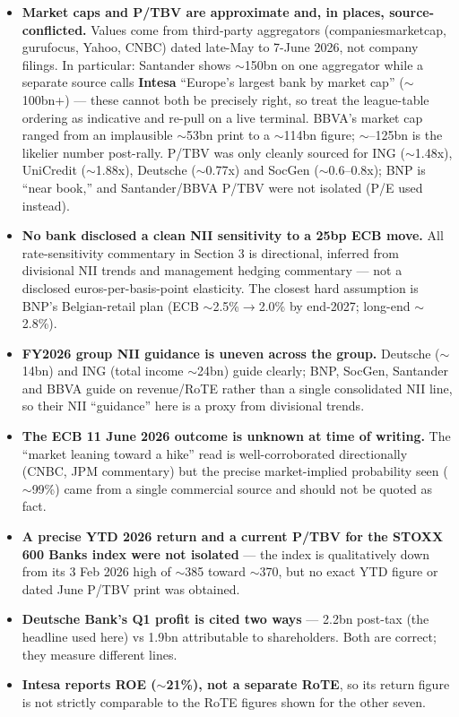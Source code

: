 \documentclass[10pt,a4paper]{article}
\begin{document}
\begin{itemize}
\item \textbf{Market caps and P/TBV are approximate and, in places, source-conflicted.} Values come from third-party aggregators (companiesmarketcap, gurufocus, Yahoo, CNBC) dated late-May to 7-June 2026, not company filings. In particular: Santander shows $\sim$\texteuro150bn on one aggregator while a separate source calls \textbf{Intesa} ``Europe's largest bank by market cap'' ($\sim$\texteuro100bn+) --- these cannot both be precisely right, so treat the league-table ordering as indicative and re-pull on a live terminal. BBVA's market cap ranged from an implausible $\sim$\texteuro53bn print to a $\sim$\texteuro114bn figure; $\sim$--125bn is the likelier number post-rally. P/TBV was only cleanly sourced for ING ($\sim$1.48x), UniCredit ($\sim$1.88x), Deutsche ($\sim$0.77x) and SocGen ($\sim$0.6--0.8x); BNP is ``near book,'' and Santander/BBVA P/TBV were not isolated (P/E used instead).

\item \textbf{No bank disclosed a clean NII sensitivity to a 25bp ECB move.} All rate-sensitivity commentary in Section 3 is directional, inferred from divisional NII trends and management hedging commentary --- not a disclosed euros-per-basis-point elasticity. The closest hard assumption is BNP's Belgian-retail plan (ECB $\sim$2.5\%$\rightarrow$2.0\% by end-2027; long-end $\sim$2.8\%).

\item \textbf{FY2026 group NII guidance is uneven across the group.} Deutsche ($\sim$\texteuro14bn) and ING (total income $\sim$\texteuro24bn) guide clearly; BNP, SocGen, Santander and BBVA guide on revenue/RoTE rather than a single consolidated NII line, so their NII ``guidance'' here is a proxy from divisional trends.

\item \textbf{The ECB 11 June 2026 outcome is unknown at time of writing.} The ``market leaning toward a hike'' read is well-corroborated directionally (CNBC, JPM commentary) but the precise market-implied probability seen ($\sim$99\%) came from a single commercial source and should not be quoted as fact.

\item \textbf{A precise YTD 2026 return and a current P/TBV for the STOXX 600 Banks index were not isolated} --- the index is qualitatively down from its 3 Feb 2026 high of $\sim$385 toward $\sim$370, but no exact YTD figure or dated June P/TBV print was obtained.

\item \textbf{Deutsche Bank's Q1 profit is cited two ways} --- \texteuro2.2bn post-tax (the headline used here) vs \texteuro1.9bn attributable to shareholders. Both are correct; they measure different lines.

\item \textbf{Intesa reports ROE ($\sim$21\%), not a separate RoTE}, so its return figure is not strictly comparable to the RoTE figures shown for the other seven.
\end{itemize}
\end{document}
